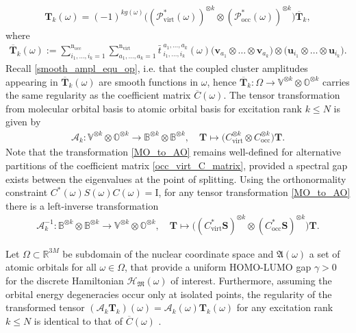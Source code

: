 \documentclass[reqno]{amsart}
\begin{document}
\begin{align}\label{param_exc_decomp}
    \mathbf{T}_k(\omega)=(-1)^{kg(\omega)} \big((\mathscr{P}_{\text{virt}}^*(\omega))^{\otimes k}\otimes (\mathscr{P}^*_{\text{occ}}(\omega))^{\otimes k}\big) \overline{\mathbf{T}}_k,
\end{align}
where
\begin{align}
    \overline{\mathbf{T}}_k(\omega):=\sum_{i_1,\ldots,i_k=1}^{\text{n}_\text{occ}}\sum^{\text{n}_\text{virt}}_{a_1,\ldots,a_{k}=1}\bar{t}^{\;a_1,\ldots,a_k}_{\;i_1,\ldots,i_k}(\omega) \big( \mathbf{v}_{a_1}\otimes \ldots \otimes \mathbf{v}_{a_k}  \big) \otimes \big(\mathbf{u}_{i_1}\otimes \ldots \otimes \mathbf{u}_{i_k}\big).
\end{align}
Recall \eqref{smooth_ampl_equ_op}, i.e. that the coupled cluster amplitudes appearing in $\overline{\mathbf{T}}_k(\omega)$ are smooth functions in $\omega$, hence $\overline{\mathbf{T}}_k:\Omega\longrightarrow \mathbb{V}^{\otimes k}\otimes \mathbb{O}^{\otimes k}$ carries the same regularity as the coefficient matrix $\overline{C}(\omega)$. The tensor transformation from molecular orbital basis to atomic orbital basis for excitation rank $k\le N$ is given by
\begin{align}\label{MO_to_AO}
\mathcal{A}_k:\mathbb{V}^{\otimes k}\otimes \mathbb{O}^{\otimes k} \longrightarrow \mathbb{B}^{\otimes k}\otimes \mathbb{B}^{\otimes k},\quad \mathbf{T}\mapsto
    \big(C_{\text{virt}}^{\otimes k}\otimes C_{\text{occ}}^{\otimes k}\big)\mathbf{T}.
\end{align} 
Note that the transformation \eqref{MO_to_AO} remains well-defined for alternative partitions of the coefficient matrix \eqref{occ_virt_C_matrix}, provided a spectral gap exists between the eigenvalues at the point of splitting. Using the orthonormality constraint $C^*(\omega)S(\omega)C(\omega)=\mathrm{I}$, for any tensor transformation \eqref{MO_to_AO} there is a left-inverse transformation 
\begin{align}\label{AO_to_MO}
    \mathcal{A}_k^{-1}:\mathbb{B}^{\otimes k}\otimes \mathbb{B}^{\otimes k} \longrightarrow \mathbb{V}^{\otimes k}\otimes \mathbb{O}^{\otimes k},\quad \mathbf{T}\mapsto \big((C^*_{\text{virt}}\mathbf{S})^{\otimes k}\otimes (C^*_{\text{occ}}\mathbf{S})^{\otimes k}\big)\mathbf{T}.
\end{align}
\begin{theorem}\label{MO_AO_makes_high_reg}
    Let $\Omega\subset \mathbb{R}^{3M}$ be subdomain of the nuclear coordinate space and $\mathfrak{A}(\omega)$ a set of atomic orbitals for all $\omega\in\Omega$, that provide a uniform HOMO-LUMO gap $\gamma>0$ for the discrete Hamiltonian $\mathcal{H}_\mathfrak{M}(\omega)$ of interest. Furthermore, assuming the orbital energy degeneracies occur only at isolated points, the regularity of the transformed tensor $(\mathcal{A}_k\mathbf{T}_k)(\omega)=\mathcal{A}_k(\omega)\mathbf{T}_k(\omega)$ for any excitation rank $k\le N$ is identical to that of $\overline{C}(\omega)$ . 
\end{theorem}
\end{document}
